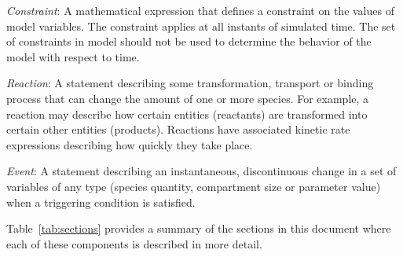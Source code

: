 \begin{description}
\item \emph{Constraint}: A mathematical expression that
  defines a constraint on the values of model variables.  The
  constraint applies at all instants of simulated time.  The set
  of constraints in model should not be used to determine the
  behavior of the model with respect to time.
  
\item \emph{Reaction}: A statement describing some transformation,
  transport or binding process that can change the amount of one
  or more species.  For example, a reaction may describe how
  certain entities (reactants) are transformed into certain other
  entities (products).  Reactions have associated kinetic rate
  expressions describing how quickly they take place.
  
\item \emph{Event}: A statement describing an instantaneous,
  discontinuous change in a set of variables of any type (species
  quantity, compartment size or parameter value) when a
  triggering condition is satisfied.

\end{description}

Table~\ref{tab:sections} provides a summary of the sections in this
document where each of these components is described in more detail.

